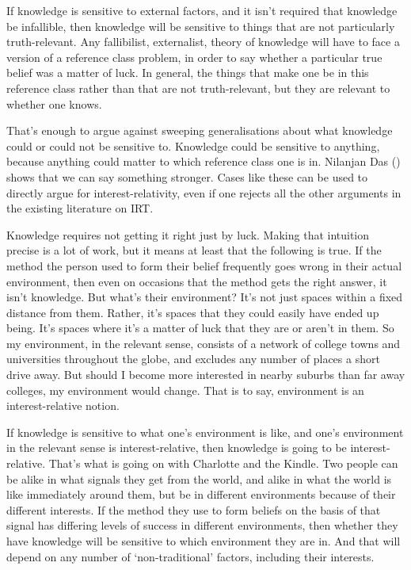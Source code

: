 \documentclass[
  12pt,
  letterpaper,
]{scrbook}
\begin{document}
If knowledge is sensitive to external factors, and it isn't required
that knowledge be infallible, then knowledge will be sensitive to things
that are not particularly truth-relevant. Any fallibilist, externalist,
theory of knowledge will have to face a version of a reference class
problem, in order to say whether a particular true belief was a matter
of luck. In general, the things that make one be in this reference class
rather than that are not truth-relevant, but they are relevant to
whether one knows.

That's enough to argue against sweeping generalisations about what
knowledge could or could not be sensitive to. Knowledge could be
sensitive to anything, because anything could matter to which reference
class one is in. Nilanjan Das ()
shows that we can say something stronger. Cases like these can be used
to directly argue for interest-relativity, even if one rejects all the
other arguments in the existing literature on IRT.

Knowledge requires not getting it right just by luck. Making that
intuition precise is a lot of work, but it means at least that the
following is true. If the method the person used to form their belief
frequently goes wrong in their actual environment, then even on
occasions that the method gets the right answer, it isn't knowledge. But
what's their environment? It's not just spaces within a fixed distance
from them. Rather, it's spaces that they could easily have ended up
being. It's spaces where it's a matter of luck that they are or aren't
in them. So my environment, in the relevant sense, consists of a network
of college towns and universities throughout the globe, and excludes any
number of places a short drive away. But should I become more interested
in nearby suburbs than far away colleges, my environment would change.
That is to say, environment is an interest-relative notion.

If knowledge is sensitive to what one's environment is like, and one's
environment in the relevant sense is interest-relative, then knowledge
is going to be interest-relative. That's what is going on with Charlotte
and the Kindle. Two people can be alike in what signals they get from
the world, and alike in what the world is like immediately around them,
but be in different environments because of their different interests.
If the method they use to form beliefs on the basis of that signal has
differing levels of success in different environments, then whether they
have knowledge will be sensitive to which environment they are in. And
that will depend on any number of `non-traditional' factors, including
their interests.
\end{document}
